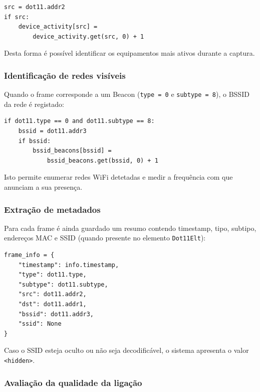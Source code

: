 \documentclass[a4paper,12pt]{article}
\begin{document}
\begin{lstlisting}[style=python]
src = dot11.addr2
if src:
    device_activity[src] =
        device_activity.get(src, 0) + 1
\end{lstlisting}

Desta forma é possível identificar os equipamentos mais ativos durante a captura.

\subsubsection{Identificação de redes visíveis}

Quando o frame corresponde a um Beacon (\texttt{type = 0} e \texttt{subtype = 8}), o BSSID da rede é registado:

\vspace{0.5em}

\begin{lstlisting}[style=python]
if dot11.type == 0 and dot11.subtype == 8:
    bssid = dot11.addr3
    if bssid:
        bssid_beacons[bssid] =
            bssid_beacons.get(bssid, 0) + 1
\end{lstlisting}

Isto permite enumerar redes WiFi detetadas e medir a frequência com que anunciam a sua presença.

\subsubsection{Extração de metadados}

Para cada frame é ainda guardado um resumo contendo timestamp, tipo, subtipo, endereços MAC e SSID (quando presente no elemento \texttt{Dot11Elt}):

\vspace{0.5em}

\begin{lstlisting}[style=python]
frame_info = {
    "timestamp": info.timestamp,
    "type": dot11.type,
    "subtype": dot11.subtype,
    "src": dot11.addr2,
    "dst": dot11.addr1,
    "bssid": dot11.addr3,
    "ssid": None
}
\end{lstlisting}

Caso o SSID esteja oculto ou não seja decodificável, o sistema apresenta o valor \texttt{<hidden>}.

\subsubsection{Avaliação da qualidade da ligação}
\end{document}
